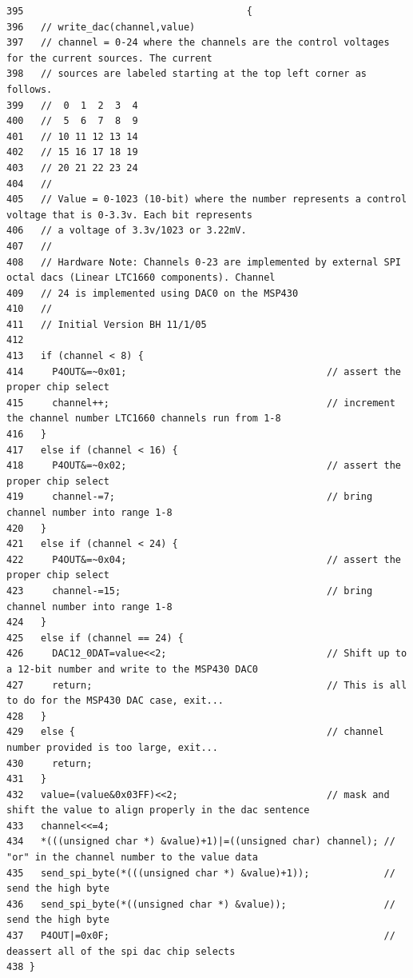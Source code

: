\footnotesize\begin{verbatim}395                                       {
396   // write_dac(channel,value)
397   // channel = 0-24 where the channels are the control voltages for the current sources. The current 
398   // sources are labeled starting at the top left corner as follows.
399   //  0  1  2  3  4
400   //  5  6  7  8  9
401   // 10 11 12 13 14
402   // 15 16 17 18 19
403   // 20 21 22 23 24
404   //
405   // Value = 0-1023 (10-bit) where the number represents a control voltage that is 0-3.3v. Each bit represents 
406   // a voltage of 3.3v/1023 or 3.22mV. 
407   //
408   // Hardware Note: Channels 0-23 are implemented by external SPI octal dacs (Linear LTC1660 components). Channel 
409   // 24 is implemented using DAC0 on the MSP430 
410   // 
411   // Initial Version BH 11/1/05
412 
413   if (channel < 8) {
414     P4OUT&=~0x01;                                   // assert the proper chip select
415     channel++;                                      // increment the channel number LTC1660 channels run from 1-8   
416   }           
417   else if (channel < 16) {
418     P4OUT&=~0x02;                                   // assert the proper chip select
419     channel-=7;                                     // bring channel number into range 1-8
420   } 
421   else if (channel < 24) {
422     P4OUT&=~0x04;                                   // assert the proper chip select
423     channel-=15;                                    // bring channel number into range 1-8
424   }
425   else if (channel == 24) {
426     DAC12_0DAT=value<<2;                            // Shift up to a 12-bit number and write to the MSP430 DAC0 
427     return;                                         // This is all to do for the MSP430 DAC case, exit...
428   }
429   else {                                            // channel number provided is too large, exit... 
430     return;
431   }
432   value=(value&0x03FF)<<2;                          // mask and shift the value to align properly in the dac sentence
433   channel<<=4;
434   *(((unsigned char *) &value)+1)|=((unsigned char) channel); // "or" in the channel number to the value data
435   send_spi_byte(*(((unsigned char *) &value)+1));             // send the high byte 
436   send_spi_byte(*((unsigned char *) &value));                 // send the high byte 
437   P4OUT|=0x0F;                                                // deassert all of the spi dac chip selects   
438 }
\end{verbatim}\normalsize 




